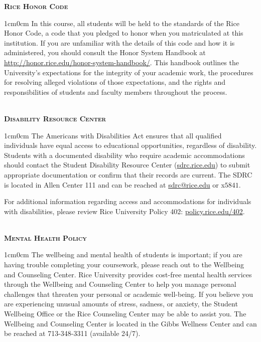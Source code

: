 \textbf{\textsc{Rice Honor Code}}
\begin{adjustwidth}{1cm}{0cm}
  In this course, all students will be held to the standards of the Rice Honor Code, a code that you pledged to honor when you matriculated at this institution. If you are unfamiliar with the details of this code and how it is administered, you should consult the Honor System Handbook at \url{http://honor.rice.edu/honor-system-handbook/}. This handbook outlines the University's expectations for the integrity of your academic work, the procedures for resolving alleged violations of those expectations, and the rights and responsibilities of students and faculty members throughout the process.
\end{adjustwidth}

~\\
\textbf{\textsc{Disability Resource Center}}
\begin{adjustwidth}{1cm}{0cm}
  The Americans with Disabilities Act ensures that all qualified individuals have equal access to educational opportunities, regardless of disability. Students with a documented disability who require academic accommodations should contact the Student Disability Resource Center (\href{https://sdrc.rice.edu}{sdrc.rice.edu}) to submit appropriate documentation or confirm that their records are current. The SDRC is located in Allen Center 111 and can be reached at \href{mailto:sdrc@rice.edu}{sdrc@rice.edu} or x$5841$.

  For additional information regarding access and accommodations for individuals with disabilities, please review Rice University Policy 402: \href{https://policy.rice.edu/402}{policy.rice.edu/402}.
\end{adjustwidth}

~\\
\textbf{\textsc{Mental Health Policy}}
\begin{adjustwidth}{1cm}{0cm}
	The wellbeing and mental health of students is important; if you are having trouble completing your coursework, please reach out to the Wellbeing and Counseling Center. Rice University provides cost-free mental health services through the Wellbeing and Counseling Center to help you manage personal challenges that threaten your personal or academic well-being. If you believe you are experiencing unusual amounts of stress, sadness, or anxiety, the Student Wellbeing Office or the Rice Counseling Center may be able to assist you. The Wellbeing and Counseling Center is located in the Gibbs Wellness Center and can be reached at 713-348-3311 (available 24/7).
\end{adjustwidth}

